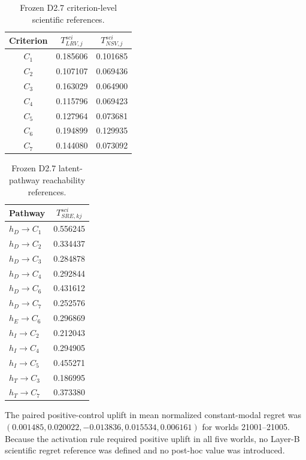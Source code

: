 \documentclass[runningheads,orivec]{llncs}
\begin{document}
\begin{table}[t]
\centering
\caption{Frozen D2.7 criterion-level scientific references.}
\label{supp:tab:d27layera}
\small
\begin{tabular}{@{}ccc@{}}
\toprule
Criterion & $T^{sci}_{LRV,j}$ & $T^{sci}_{NSV,j}$\\
\midrule
$C_1$ & 0.185606 & 0.101685\\
$C_2$ & 0.107107 & 0.069436\\
$C_3$ & 0.163029 & 0.064900\\
$C_4$ & 0.115796 & 0.069423\\
$C_5$ & 0.127964 & 0.073681\\
$C_6$ & 0.194899 & 0.129935\\
$C_7$ & 0.144080 & 0.073092\\
\bottomrule
\end{tabular}
\end{table}

\begin{table}[t]
\centering
\caption{Frozen D2.7 latent-pathway reachability references.}
\label{supp:tab:d27sre}
\small
\begin{tabular}{@{}lc@{}}
\toprule
Pathway & $T^{sci}_{SRE,kj}$\\
\midrule
$h_D\rightarrow C_1$ & 0.556245\\
$h_D\rightarrow C_2$ & 0.334437\\
$h_D\rightarrow C_3$ & 0.284878\\
$h_D\rightarrow C_4$ & 0.292844\\
$h_D\rightarrow C_6$ & 0.431612\\
$h_D\rightarrow C_7$ & 0.252576\\
$h_E\rightarrow C_6$ & 0.296869\\
$h_I\rightarrow C_2$ & 0.212043\\
$h_I\rightarrow C_4$ & 0.294905\\
$h_I\rightarrow C_5$ & 0.455271\\
$h_T\rightarrow C_3$ & 0.186995\\
$h_T\rightarrow C_7$ & 0.373380\\
\bottomrule
\end{tabular}
\end{table}

The paired positive-control uplift in mean normalized constant-modal regret was
$(0.001485,0.020022,-0.013836,0.015534,0.006161)$ for worlds 21001--21005. Because the activation
rule required positive uplift in all five worlds, no Layer-B scientific regret reference was
defined and no post-hoc value was introduced.
\end{document}
